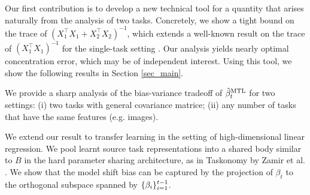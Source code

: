 Our first contribution is to develop a new technical tool for a quantity that arises naturally from the analysis of two tasks.
Concretely, we show a tight bound on the trace of $(X_1^{\top}X_1 + X_2^{\top}X_2)^{-1}$, which extends a well-known result on the trace of $(X_1^{\top}X_1)^{-1}$ for the single-task setting \cite{S07}.
Our analysis yields nearly optimal concentration error, which may be of independent interest.
Using this tool, we show the following results in Section \ref{sec_main}.
\squishlist
	\item We provide a sharp analysis of the bias-variance tradeoff of $\hat{\beta}_t^{\text{MTL}}$ for two settings:
(i) two tasks with general covariance matrice; (ii) any number of tasks that have the same features (e.g. images).
	\item We extend our result to transfer learning in the setting of high-dimensional linear regression.
	We pool learnt source task representations into a shared body similar to $B$ in the hard parameter sharing architecture, as in Taskonomy by Zamir et al. \cite{ZSSGM18}.
	We show that the model shift bias can be captured by the projection of $\beta_t$ to the orthogonal subspace spanned by $\{\beta_i\}_{i=1}^{t-1}$.
\squishend

